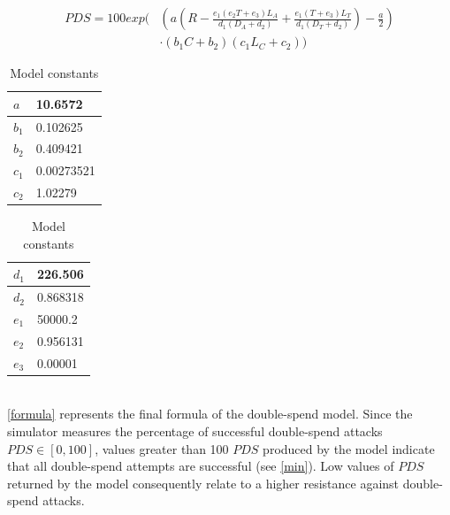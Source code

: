 \documentclass[a4paper,12pt,twoside]{report}
\begin{document}
\begin{equation}\label{formula}
\begin{split}
PDS = 100 exp \Biggl( & \left( a \left( R-\frac{e_1 \left( e_2T+e_3 \right) L_A}{d_1 \left( D_A+d_2 \right)}+\frac{e_1 \left( T+e_3 \right) L_T}{d_1 \left( D_T+d_2 \right)} \right) - \frac{a}{2} \right) \\
           & \cdot \left( b_1C+b_2 \right) \left( c_1L_C+c_2 \right) \Biggr)
\end{split}
\end{equation}
\begin{table}[hb!]
\centering
\begin{tabular}{|l|l|} \hline
$a$ & 10.6572 \\ \hline
$b_1$ & 0.102625 \\ \hline
$b_2$ & 0.409421 \\ \hline
$c_1$ & 0.00273521 \\ \hline
$c_2$ & 1.02279 \\ \hline
\end{tabular}
\begin{tabular}{|l|l|} \hline
$d_1$ & 226.506 \\ \hline
$d_2$ & 0.868318 \\ \hline
$e_1$ & 50000.2 \\ \hline
$e_2$ & 0.956131 \\ \hline
$e_3$ & 0.00001 \\ \hline
\end{tabular}
\caption{Model constants}
\label{constants}
\end{table}
\\
\autoref{formula} represents the final formula of the double-spend model. Since the simulator measures the percentage of successful double-spend attacks $PDS \in [0, 100]$, values greater than 100 $PDS$ produced by the model indicate that all double-spend attempts are successful (see \autoref{min}). Low values of $PDS$ returned by the model consequently relate to a higher resistance against double-spend attacks.
\end{document}
